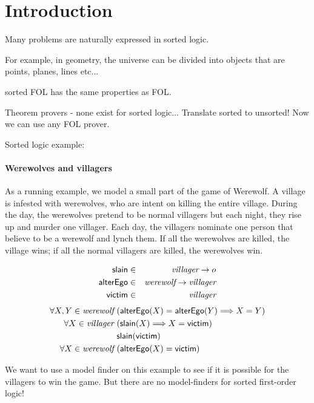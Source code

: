 \section{Introduction}

Many problems are naturally expressed in sorted logic.

For example, in geometry, the universe can be divided into 
objects that are points, planes, lines etc...

sorted FOL has the same properties as  FOL.

Theorem provers - none exist for sorted logic...
Translate sorted to unsorted! Now we can use any FOL prover.

Sorted logic example:

\paragraph{Werewolves and villagers} As a running example, we model a
small part of the game of Werewolf. A village is infested with
werewolves, who are intent on killing the entire village. 
During the day, the werewolves pretend to be normal villagers but each
night, they rise up and murder one villager. Each day, the villagers
nominate one person that believe to be a werewolf and lynch them. If
all the werewolves are killed, the village wins; if all the normal
villagers are killed, the werewolves win.

\begin{example}
\label{ex:werewolf1}
\begin{eqnarray*}
\mbox {\sf slain} & \in & \textit{villager} \to o \\ 
\mbox {\sf alterEgo} & \in & \textit{werewolf} \to \textit{villager} \\
\mbox{\sf victim} & \in & \textit{villager} 
\end{eqnarray*}
\begin{align*}
\forall X,Y \in \textit{werewolf} \ & ( \mbox {\sf alterEgo} (X) = \mbox {\sf alterEgo} (Y) \Longrightarrow  X = Y) \\
 \forall X \in \textit{villager}\ & (\mbox {\sf slain}(X) \Longrightarrow X = \mbox{\sf victim}) \\
 & \mbox {\sf slain}(\mbox{\sf victim}) \\
 \forall X \in \textit{werewolf} \  & (\mbox {\sf alterEgo}(X) = \mbox{\sf victim})
\end{align*} 
\end{example}

We want to use a model finder on this example to see if it is possible
for the villagers to win the game. But there are no model-finders for
sorted first-order logic!

